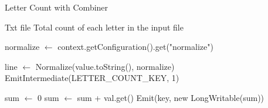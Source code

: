\begin{algorithm}[H]
    \caption{Letter Count with Combiner}
    \begin{algorithmic}[1]
    \Require Txt file
    \Ensure Total count of each letter in the input file
    
    \Statex
            \State normalize $\leftarrow$ context.getConfiguration().get("normalize")
        \EndProcedure
    
            \State line $\leftarrow$ Normalize(value.toString(), normalize) 
                \State EmitIntermediate(LETTER\_COUNT\_KEY, 1)
            \EndFor
        \EndProcedure
    \EndClass
    
    \Statex
            \State sum $\leftarrow$ 0
                \State sum $\leftarrow$ sum + val.get()
            \EndFor
            \State Emit(key, new LongWritable(sum))
        \EndProcedure
    \EndClass
    \end{algorithmic}
    \end{algorithm}
    
